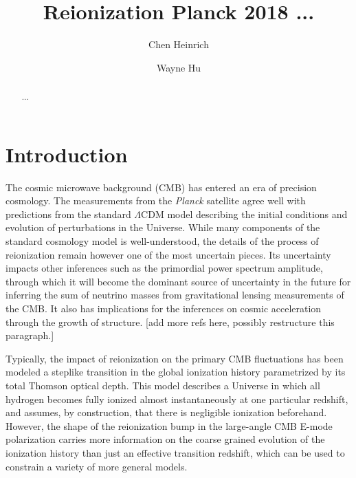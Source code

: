\documentclass[prd,twocolumn,amsmath,amssymb,floatfix,superscriptaddress,nofootinbib]{revtex4-1}
\begin{document}
	
\title{Reionization Planck 2018 ...}

\author{Chen Heinrich}

\author{Wayne Hu}

\begin{abstract}

...

\end{abstract}
\pacs{}

\maketitle




\section{Introduction}
\label{sec:intro}

The cosmic microwave background (CMB) has entered an era of precision cosmology. The measurements from the \textit{Planck} satellite agree well with predictions from the standard $\Lambda$CDM model describing the initial conditions and evolution of perturbations in the Universe. While many components of the standard cosmology model is well-understood, the details of the process of reionization remain however one of the most uncertain pieces. Its uncertainty impacts other inferences such as the primordial power spectrum amplitude, through which it will become the dominant source of uncertainty in the future for inferring the sum of neutrino masses from gravitational lensing measurements of the CMB. It also has implications for the inferences on cosmic acceleration through the growth of structure. [add more refs here, possibly restructure this paragraph.]

Typically, the impact of reionization on the primary CMB fluctuations has been modeled a steplike transition in the global ionization history parametrized by its total Thomson optical depth. This model describes a Universe in which all hydrogen becomes fully ionized almost instantaneously at one particular redshift, and assumes, by construction, that there is negligible ionization beforehand. However, the shape of the reionization bump in the large-angle CMB E-mode polarization carries more information on the coarse grained evolution of the ionization history than just an effective transition redshift, which can be used to constrain a variety of more general models.
\end{document}
